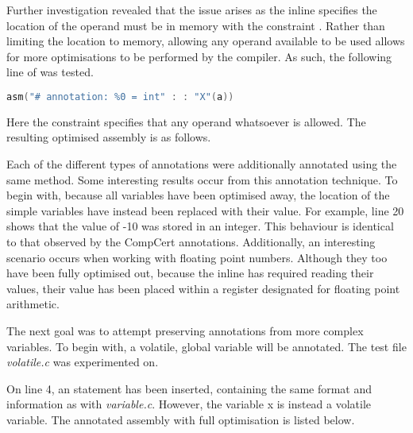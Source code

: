 Further investigation revealed that the issue arises as the inline  specifies the location of the operand must be in memory with the constraint . Rather than limiting the location to memory, allowing any operand available to be used allows for more optimisations to be performed by the compiler. As such, the following line of  was tested. 

\begin{lstlisting}[language=C, numbers=none]
asm("# annotation: %0 = int" : : "X"(a))
\end{lstlisting}

Here the constraint  specifies that any operand whatsoever is allowed. The resulting optimised assembly is as follows.



Each of the different types of annotations were additionally annotated using the same method. Some interesting results occur from this annotation technique. To begin with, because all variables have been optimised away, the location of the simple variables have instead been replaced with their value. For example, line 20 shows that the value of -10 was stored in an integer. This behaviour is identical to that observed by the CompCert annotations. Additionally, an interesting scenario occurs when working with floating point numbers. Although they too have been fully optimised out, because the inline  has required reading their values, their value has been placed within a register designated for floating point arithmetic. 

The next goal was to attempt preserving annotations from more complex variables. To begin with, a volatile, global variable will be annotated. The test file \textit{volatile.c} was experimented on.



On line 4, an  statement has been inserted, containing the same format and information as with \textit{variable.c}. However, the variable x is instead a volatile variable. The annotated assembly with full optimisation is listed below.



